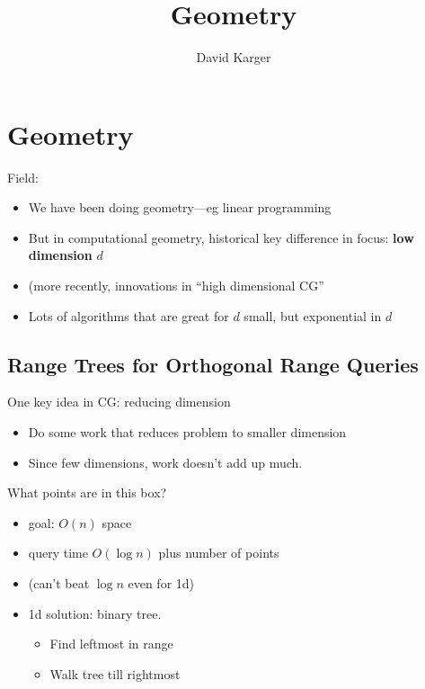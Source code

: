 \documentclass{article}
\title{Geometry}
\author{David Karger}
\begin{document}
\section{Geometry}

Field:
\begin{itemize}
\item We have been doing geometry---eg linear programming
\item But in computational geometry, historical key difference in focus: \textbf{low dimension} $d$
\item (more recently, innovations in ``high dimensional CG'' 
\item Lots of algorithms that are great for $d$ small, but exponential
  in $d$
\end{itemize}

\newcommand{\conv}{\mathit{conv}}


\subsection{Range Trees for Orthogonal Range Queries}

One key idea in CG: reducing dimension
\begin{itemize}
\item Do some work that reduces problem to smaller dimension
\item Since few dimensions, work doesn't add up much.
\end{itemize}

What points are in this box?
\begin{itemize}
\item goal: $O(n)$ space
\item query time $O(\log n)$ plus number of points
\item (can't beat $\log n$ even for 1d)
\item 1d solution: binary tree.  
\begin{itemize}
\item Find leftmost in range
\item Walk tree till rightmost
\end{itemize}
\end{itemize}
\end{document}
